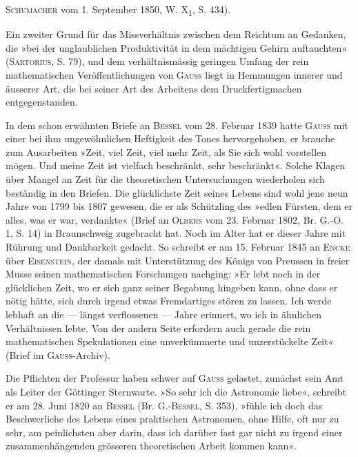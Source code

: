 \textsc{Schumacher} vom 1. September 1850, W. X\textsubscript{1}, S. 434).
\par
Ein zweiter Grund für das Missverhältnis zwischen dem Reichtum an
Gedanken, die »bei der unglaublichen Produktivität in dem mächtigen Gehirn
auftauchten« (\textsc{Sartorius}, S. 79), und dem verhältnismässig geringen Umfang
der rein mathematischen Veröffentlichungen von \textsc{Gauss} liegt in Hemmungen
innerer und äusserer Art, die bei seiner Art des Arbeitens dem Druckfertigmachen
entgegenstanden.
\par
In dem schon erwähnten Briefe an \textsc{Bessel} vom 28. Februar 1839 hatte
\textsc{Gauss} mit einer bei ihm ungewöhnlichen Heftigkeit des Tones hervorgehoben,
er brauche zum Ausarbeiten »Zeit, viel Zeit, viel mehr Zeit, als Sie sich wohl
vorstellen mögen. Und meine Zeit ist vielfach beschränkt, sehr beschränkt«.
Solche Klagen über Mangel an Zeit für die theoretischen Untersuchungen
wiederholen sich beständig in den Briefen. Die glücklichste Zeit seines Lebens
sind wohl jene neun Jahre von 1799 bis 1807 gewesen, die er als Schützling
des »edlen Fürsten, dem er alles, was er war, verdankte« (Brief an \textsc{Olbers}
\clearpage{}\setcounter{footnote}{0}
\noindent vom 23. Februar 1802, Br. G.-O. 1, S. 14) in Braunschweig zugebracht hat.
Noch im Alter hat er dieser Jahre mit Rührung und Dankbarkeit gedacht.
So schreibt er am 15. Februar 1845 an \textsc{Encke} über \textsc{Eisenstein}, der damals
mit Unterstützung des Königs von Preussen in freier Musse seinen mathematischen
Forschungen nachging: »Er lebt noch in der glücklichen Zeit, wo
er sich ganz seiner Begabung hingeben kann, ohne dass er nötig hätte, sich
durch irgend etwas Fremdartiges stören zu lassen. Ich werde lebhaft an die
— längst verflossenen — Jahre erinnert, wo ich in ähnlichen Verhältnissen
lebte. Von der andern Seite erfordern auch gerade die rein mathematischen
Spekulationen eine unverkümmerte und unzerstückelte Zeit« (Brief im \textsc{Gauss}-Archiv).
\par
Die Pflichten der Professur haben schwer auf \textsc{Gauss} gelastet, zunächst
sein Amt als Leiter der Göttinger Sternwarte. »So sehr ich die Astronomie
liebe«, schreibt er am 28. Juni 1820 an \textsc{Bessel} (Br. G.-\textsc{Bessel}, S. 353), »fühle ich
doch das Beschwerliche des Lebens eines praktischen Astronomen, ohne Hilfe,
oft nur zu sehr, am peinlichsten aber darin, dass ich darüber fast gar nicht
zu irgend einer zusammenhängenden grösseren theoretischen Arbeit kommen
kann«.
